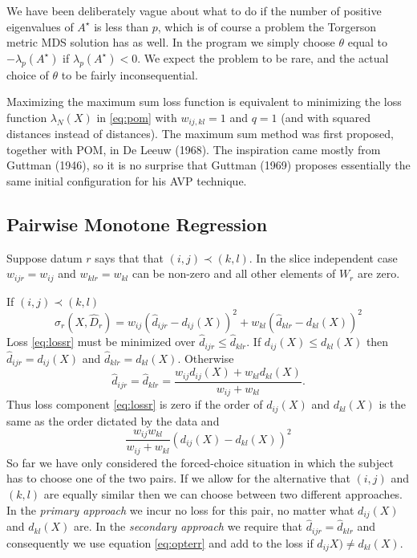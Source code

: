 \documentclass[
  12pt,
]{article}
\begin{document}
We have been deliberately vague about what to do if the number of
positive eigenvalues of \(A^\star\) is less than \(p\), which is of
course a problem the Torgerson metric MDS solution has as well. In the
program we simply choose \(\theta\) equal to \(-\lambda_p(A^\star)\)
if \(\lambda_p(A^\star)<0\). We expect the problem to be rare, and
the actual choice of \(\theta\) to be fairly inconsequential.

Maximizing the maximum sum loss function is equivalent to minimizing
the loss function \(\lambda_N(X)\) in \eqref{eq:pom} with \(w_{ij,kl}=1\)
and \(q=1\) (and with squared distances instead of distances). The
maximum sum method was first proposed, together with POM, in De Leeuw (1968).
The inspiration came mostly from Guttman (1946), so it is no surprise that
Guttman (1969) proposes essentially the same initial configuration for his
AVP technique.

\subsection{Pairwise Monotone Regression}\label{pairwise-monotone-regression}

Suppose datum \(r\) says that that \((i,j)\prec(k,l)\). In the slice independent case \(w_{ijr}=w_{ij}\) and \(w_{klr}=w_{kl}\)
can be non-zero and all other elements of \(W_r\) are zero.

If \((i,j)\prec(k,l)\)
\begin{equation}
\sigma_r(X,\hat D_r)=w_{ij}(\hat d_{ijr}-d_{ij}(X))^2+w_{kl}(\hat d_{klr}-d_{kl}(X))^2
\label{eq:lossr}
\end{equation}
Loss \eqref{eq:lossr} must be minimized over \(\hat d_{ijr}\leq\hat d_{klr}\). If \(d_{ij}(X)\leq d_{kl}(X)\)
then \(\hat d_{ijr}=d_{ij}(X)\) and \(\hat d_{klr}=d_{kl}(X)\). Otherwise
\begin{equation}
\hat d_{ijr}=\hat d_{klr}=\frac{w_{ij}d_{ij}(X)+w_{kl}d_{kl}(X)}{w_{ij}+w_{kl}}.
\label{eq:opterr}
\end{equation}
Thus loss component \eqref{eq:lossr} is zero if the order of \(d_{ij}(X)\) and \(d_{kl}(X)\) is the same as the order dictated by the data
and
\begin{equation}
\frac{w_{ij}w_{kl}}{w_{ij}+w_{kl}}(d_{ij}(X)-d_{kl}(X))^2
\label{eq:optloss}
\end{equation}
So far we have only considered the forced-choice situation in which
the subject has to choose one of the two pairs. If we allow for the alternative that \((i,j)\) and \((k,l)\) are equally similar then we can choose between two different approaches. In the \emph{primary approach} we incur no loss for this pair, no matter what \(d_{ij}(X)\) and \(d_{kl}(X)\) are. In the \emph{secondary approach} we require that \(\hat d_{ijr}=\hat d_{klr}\) and consequently we use equation \eqref{eq:opterr} and add to the loss if
\(d_{ij}X)\not= d_{kl}(X)\).
\end{document}

